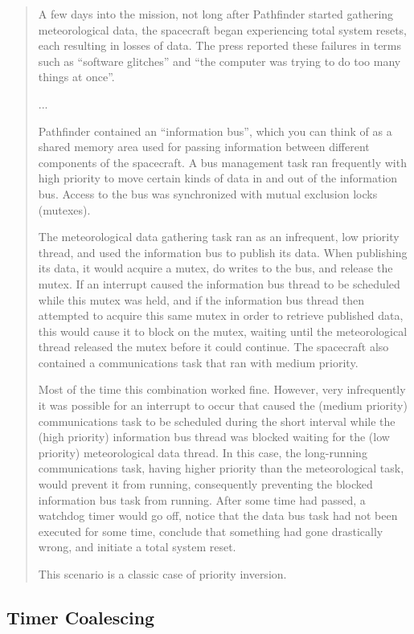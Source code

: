 \begin{quote}
A few days into the mission, not long after Pathfinder started gathering meteorological data, the spacecraft began experiencing total system resets, each resulting in losses of data. The press reported these failures in terms such as ``software glitches'' and ``the computer was trying to do too many things at once''.

...

Pathfinder contained an ``information bus'', which you can think of as a shared memory area used for passing information between different components of the spacecraft. A bus management task ran frequently with high priority to move certain kinds of data in and out of the information bus. Access to the bus was synchronized with mutual exclusion locks (mutexes).

The meteorological data gathering task ran as an infrequent, low priority thread, and used the information bus to publish its data. When publishing its data, it would acquire a mutex, do writes to the bus, and release the mutex. If an interrupt caused the information bus thread to be scheduled while this mutex was held, and if the information bus thread then attempted to acquire this same mutex in order to retrieve published data, this would cause it to block on the mutex, waiting until the meteorological thread released the mutex before it could continue. The spacecraft also contained a communications task that ran with medium priority.

Most of the time this combination worked fine. However, very infrequently it was possible for an interrupt to occur that caused the (medium priority) communications task to be scheduled during the short interval while the (high priority) information bus thread was blocked waiting for the (low priority) meteorological data thread. In this case, the long-running communications task, having higher priority than the meteorological task, would prevent it from running, consequently preventing the blocked information bus task from running. After some time had passed, a watchdog timer would go off, notice that the data bus task had not been executed for some time, conclude that something had gone drastically wrong, and initiate a total system reset.

This scenario is a classic case of priority inversion.


\end{quote}

\subsection*{Timer Coalescing}

